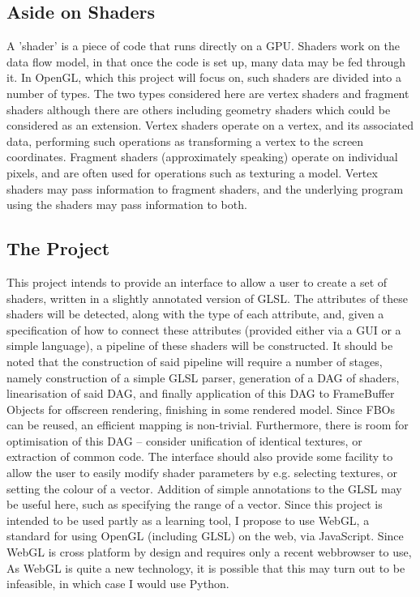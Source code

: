 \subsection*{Aside on Shaders}
A 'shader' is a piece of code that runs directly on a GPU. Shaders work on the data flow model, in
that once the code is set up, many data may be fed through it. In OpenGL, which this project will
focus on, such shaders are divided into a number of types. The two types considered here are vertex
shaders and fragment shaders although there are others including geometry shaders which could be
considered as an extension. Vertex shaders operate on a vertex, and its associated data, performing
such operations as transforming a vertex to the screen coordinates. Fragment shaders
(approximately speaking) operate on individual pixels, and are often used for operations such as
texturing a model. Vertex shaders may pass information to fragment shaders, and the underlying
program using the shaders may pass information to both.

\subsection*{The Project}
This project intends to provide an interface to allow a user to create a set of shaders, written in a
slightly annotated version of GLSL. The attributes of these shaders will be detected, along with the
type of each attribute, and, given a specification of how to connect these attributes (provided either
via a GUI or a simple language), a pipeline of these shaders will be constructed.
It should be noted that the construction of said pipeline will require a number of stages, namely
construction of a simple GLSL parser, generation of a DAG of shaders, linearisation of said DAG,
and finally application of this DAG to FrameBuffer Objects for offscreen rendering, finishing in
some rendered model. Since FBOs can be reused, an efficient mapping is non-trivial. Furthermore,
there is room for optimisation of this DAG – consider unification of identical textures, or extraction
of common code.
The interface should also provide some facility to allow the user to easily modify shader parameters
by e.g. selecting textures, or setting the colour of a vector. Addition of simple annotations to the
GLSL may be useful here, such as specifying the range of a vector.
Since this project is intended to be used partly as a learning tool, I propose to use WebGL, a
standard for using OpenGL (including GLSL) on the web, via JavaScript. Since WebGL is cross
platform by design and requires only a recent webbrowser to use, As WebGL is quite a new
technology, it is possible that this may turn out to be infeasible, in which case I would use Python.

